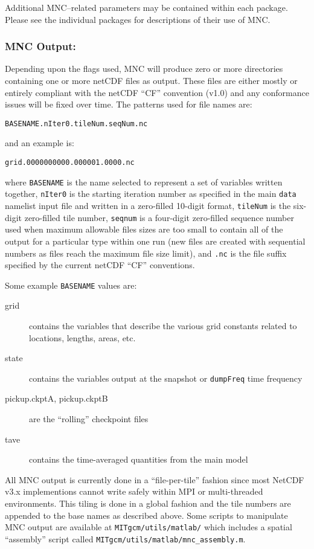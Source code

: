 Additional MNC--related parameters may be contained within each
package.  Please see the individual packages for descriptions of their
use of MNC.


\subsubsection{MNC Output:}

Depending upon the flags used, MNC will produce zero or more
directories containing one or more netCDF files as output.  These
files are either mostly or entirely compliant with the netCDF ``CF''
convention (v1.0) and any conformance issues will be fixed over time.
The patterns used for file names are:
\begin{center}
\texttt{BASENAME.nIter0.tileNum.seqNum.nc}
\end{center}
and an example is:
\begin{center}
\texttt{grid.0000000000.000001.0000.nc}
\end{center}
where \texttt{BASENAME} is the name selected to represent a set of
variables written together, \texttt{nIter0} is the starting iteration
number as specified in the main \texttt{data} namelist input file and
written in a zero-filled 10-digit format, \texttt{tileNum} is the
six-digit zero-filled tile number, \texttt{seqnum} is a four-digit
zero-filled sequence number used when maximum allowable files sizes
are too small to contain all of the output for a particular type
within one run (new files are created with sequential numbers as files
reach the maximum file size limit), and \texttt{.nc} is the file
suffix specified by the current netCDF ``CF'' conventions.

Some example \texttt{BASENAME} values are:
\begin{description}
\item[grid] contains the variables that describe the various grid
  constants related to locations, lengths, areas, etc.
\item[state] contains the variables output at the snapshot or
  \texttt{dumpFreq} time frequency
\item[pickup.ckptA, pickup.ckptB] are the ``rolling'' checkpoint files
\item[tave] contains the time-averaged quantities from the main model
\end{description}

All MNC output is currently done in a ``file-per-tile'' fashion since
most NetCDF v3.x implementions cannot write safely within MPI or
multi-threaded environments.  This tiling is done in a global fashion
and the tile numbers are appended to the base names as described
above.  Some scripts to manipulate MNC output are available at
\texttt{MITgcm/utils/matlab/} which includes a spatial ``assembly''
script called \texttt{MITgcm/utils/matlab/mnc\_assembly.m}.

